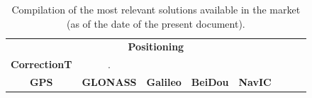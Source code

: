 

\begin{table}[ht]
    \centering
    \captionsetup{justification=centering}
    \caption{Compilation of the most relevant solutions available in the market (as of the date of the present document).}
	\label{tab:curr_solutions_positioning}
    \begin{tabular}{cccccccc} %
		\toprule
        \multicolumn{8}{c}{\textbf{Positioning}}\\
        \textbf{CorrectionT} &.
		\multicolumn{5}{c}{\textbf{SupportedC}}\\
        \textbf{GPS}&   \textbf{GLONASS}   &   \textbf{Galileo}   &   \textbf{BeiDou}   &   \textbf{NavIC}\\
        \bottomrule
	\end{tabular}
\end{table}



